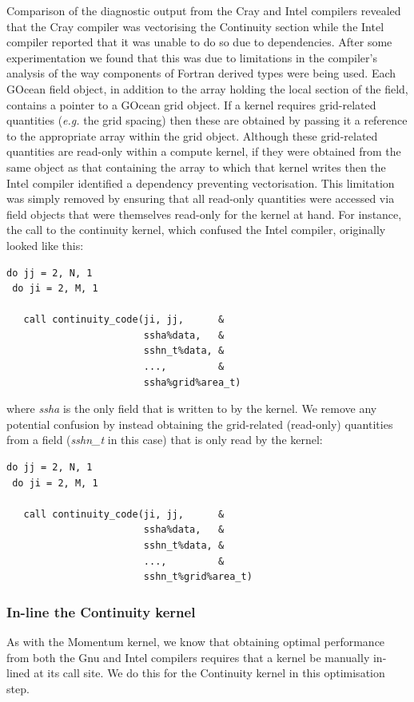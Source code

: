 \documentclass[journal]{IEEEtran}
\begin{document}
Comparison of the diagnostic output from the Cray and Intel
compilers revealed that the Cray compiler was vectorising the
Continuity section while the Intel compiler reported that it was
unable to do so due to dependencies. After some experimentation we
found that this was due to limitations in the compiler's analysis of
the way components of Fortran derived types were being used. Each
GOcean field object, in addition to the array holding the local
section of the field, contains a pointer to a GOcean grid object. If a
kernel requires grid-related quantities ({\it e.g.} the grid spacing)
then these are obtained by passing it a reference to the appropriate
array within the grid object. Although these grid-related quantities
are read-only within a compute kernel, if they were obtained from the
same object as that containing the array to which that kernel writes
then the Intel compiler identified a dependency preventing
vectorisation.  This limitation was simply removed by ensuring that
all read-only quantities were accessed via field objects that were
themselves read-only for the kernel at hand.  For instance, the call
to the continuity kernel, which confused the Intel compiler, originally
looked like this:
\begin{verbatim}
do jj = 2, N, 1
 do ji = 2, M, 1

   call continuity_code(ji, jj,      &
                        ssha%data,   &
                        sshn_t%data, &
                        ...,         &
                        ssha%grid%area_t)
\end{verbatim}
where {\it ssha} is the only field that is written to by the kernel.
We remove any potential confusion by instead obtaining the
grid-related (read-only) quantities from a field ({\it sshn\_t} in
this case) that is only read by the kernel:
\begin{verbatim}
do jj = 2, N, 1
 do ji = 2, M, 1

   call continuity_code(ji, jj,      &
                        ssha%data,   &
                        sshn_t%data, &
                        ...,         &
                        sshn_t%grid%area_t)
\end{verbatim}

\subsubsection{In-line the Continuity kernel}
\label{sec_cont_inline}

As with the Momentum kernel, we know that obtaining optimal
performance from both the Gnu and Intel compilers requires that a
kernel be manually in-lined at its call site. We do this for the
Continuity kernel in this optimisation step.
\end{document}
